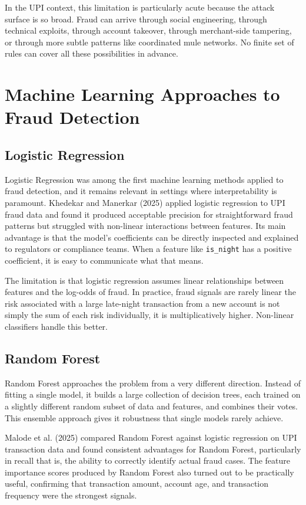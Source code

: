 In the UPI context, this limitation is particularly acute because the attack surface is so broad. Fraud can arrive through social engineering, through technical exploits, through account takeover, through merchant-side tampering, or through more subtle patterns like coordinated mule networks. No finite set of rules can cover all these possibilities in advance.

\section{Machine Learning Approaches to Fraud Detection}

\subsection{Logistic Regression}

Logistic Regression was among the first machine learning methods applied to fraud detection, and it remains relevant in settings where interpretability is paramount. Khedekar and Manerkar (2025) \cite{khedekar2025} applied logistic regression to UPI fraud data and found it produced acceptable precision for straightforward fraud patterns but struggled with non-linear interactions between features. Its main advantage is that the model's coefficients can be directly inspected and explained to regulators or compliance teams. When a feature like \texttt{is\_night} has a positive coefficient, it is easy to communicate what that means.

The limitation is that logistic regression assumes linear relationships between features and the log-odds of fraud. In practice, fraud signals are rarely linear the risk associated with a large late-night transaction from a new account is not simply the sum of each risk individually, it is multiplicatively higher. Non-linear classifiers handle this better.

\subsection{Random Forest}

Random Forest approaches the problem from a very different direction. Instead of fitting a single model, it builds a large collection of decision trees, each trained on a slightly different random subset of data and features, and combines their votes. This ensemble approach gives it robustness that single models rarely achieve.

Malode et al. (2025) \cite{malode2025} compared Random Forest against logistic regression on UPI transaction data and found consistent advantages for Random Forest, particularly in recall that is, the ability to correctly identify actual fraud cases. The feature importance scores produced by Random Forest also turned out to be practically useful, confirming that transaction amount, account age, and transaction frequency were the strongest signals.

